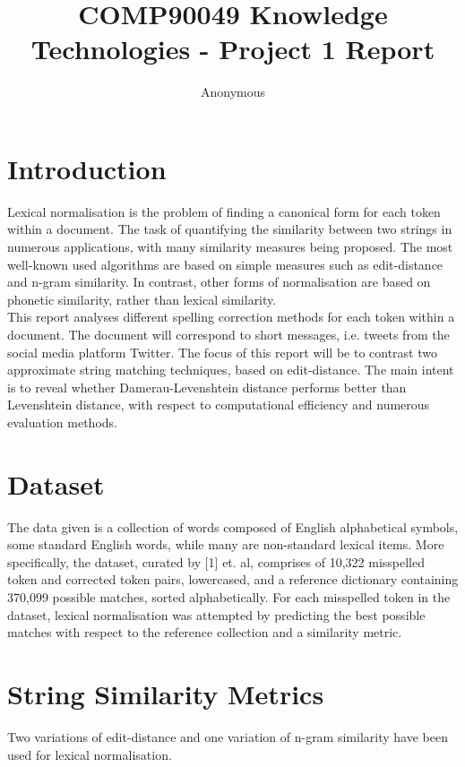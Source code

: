 \documentclass[11pt]{article}
\title{COMP90049 Knowledge Technologies - Project 1 Report}
\author
{Anonymous}
\begin{document}
\maketitle



\section{Introduction}
Lexical normalisation is the problem of finding a canonical form for each token within a document. The task of quantifying the similarity between two strings in numerous applications, with many similarity measures being proposed. The most well-known used algorithms are based on simple measures such as edit-distance and n-gram similarity. In contrast, other forms of normalisation are based on phonetic similarity, rather than lexical similarity.
\\

This report analyses different spelling correction methods for each token within a document. The document will correspond to short messages, i.e. tweets from the social media platform Twitter. The focus of this report will be to contrast two approximate string matching techniques, based on edit-distance. The main intent is to reveal whether Damerau-Levenshtein distance performs better than Levenshtein distance, with respect to computational efficiency and numerous evaluation methods.

\section{Dataset}
The data given is a collection of words composed of English alphabetical symbols, some standard English words, while many are non-standard lexical items.
More specifically, the dataset, curated by [1] et. al, comprises of 10,322 misspelled token and corrected token pairs, lowercased, and a reference dictionary containing 370,099 possible matches, sorted alphabetically. For each misspelled token in the dataset, lexical normalisation was attempted by predicting the best possible matches with respect to the reference collection and a similarity metric.

\section{String Similarity Metrics}
Two variations of edit-distance and one variation of n-gram similarity have been used for lexical normalisation.
\end{document}
